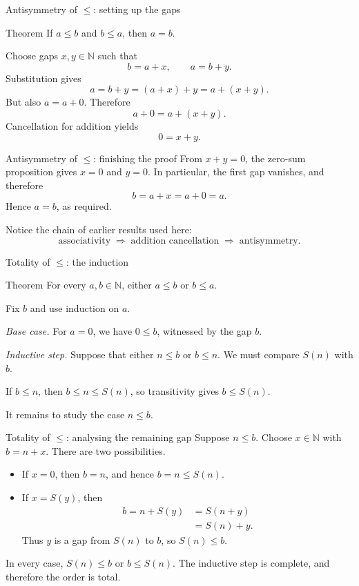 \documentclass[aspectratio=169,11pt]{beamer}
\newcommand{\N}{\mathbb N}
\newcommand{\suc}[1]{S(#1)}
\begin{document}
\begin{frame}{Antisymmetry of \(\leq\): setting up the gaps}
  \begin{block}{Theorem}
    If \(a\le b\) and \(b\le a\), then \(a=b\).
  \end{block}

  Choose gaps \(x,y\in\N\) such that
  \[
    b=a+x,
    \qquad
    a=b+y.
  \]
  Substitution gives
  \[
    a=b+y=(a+x)+y=a+(x+y).
  \]
  But also \(a=a+0\).  Therefore
  \[
    a+0=a+(x+y).
  \]
  Cancellation for addition yields
  \[
    0=x+y.
  \]
\end{frame}

\begin{frame}{Antisymmetry of \(\leq\): finishing the proof}
  From \(x+y=0\), the zero-sum proposition gives \(x=0\) and \(y=0\).
  In particular, the first gap vanishes, and therefore
  \[
    b=a+x=a+0=a.
  \]
  Hence \(a=b\), as required.

\bigskip

  Notice the chain of earlier results used here:
  \[
    \text{associativity}
    \;\Longrightarrow\;
    \text{addition cancellation}
    \;\Longrightarrow\;
    \text{antisymmetry}.
  \]
\end{frame}

\begin{frame}{Totality of \(\leq\): the induction}
  \begin{block}{Theorem}
    For every \(a,b\in\N\), either \(a\le b\) or \(b\le a\).
  \end{block}

  Fix \(b\) and use induction on \(a\).

  \emph{Base case.} For \(a=0\), we have \(0\le b\), witnessed by the gap \(b\).

  \emph{Inductive step.} Suppose that either \(n\le b\) or \(b\le n\).
  We must compare \(\suc n\) with \(b\).

  If \(b\le n\), then \(b\le n\le\suc n\), so transitivity gives
  \(b\le\suc n\).

  It remains to study the case \(n\le b\).
\end{frame}

\begin{frame}{Totality of \(\leq\): analysing the remaining gap}
  Suppose \(n\le b\).  Choose \(x\in\N\) with \(b=n+x\).
  There are two possibilities.

  \begin{itemize}
    \item If \(x=0\), then \(b=n\), and hence \(b=n\le\suc n\).
    \item If \(x=\suc y\), then
      \begin{align*}
        b=n+\suc y
          &=\suc{n+y}\\
          &=\suc n+y.
      \end{align*}
      Thus \(y\) is a gap from \(\suc n\) to \(b\), so \(\suc n\le b\).
  \end{itemize}

  In every case, \(\suc n\le b\) or \(b\le\suc n\).  The inductive step is
  complete, and therefore the order is total.
\end{frame}
\end{document}
